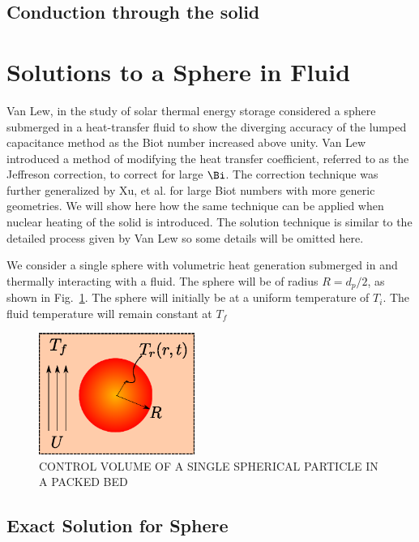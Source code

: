 \subsection{Conduction through the solid}\label{sec:ht-jeffreson-correction}


\section{Solutions to a Sphere in Fluid}
Van Lew\cite{VanLew2010}, in the study of solar thermal energy storage considered a sphere submerged in a heat-transfer fluid to show the diverging accuracy of the lumped capacitance method as the Biot number increased above unity. Van Lew introduced a method of modifying the heat transfer coefficient, referred to as the Jeffreson correction, to correct for large $\Bi$. The correction technique was further generalized by Xu, et al.\cite{Xu2012} for large Biot numbers with more generic geometries. We will show here how the same technique can be applied when nuclear heating of the solid is introduced. The solution technique is similar to the detailed process given by Van Lew\cite{VanLew2010} so some details will be omitted here.

We consider a single sphere with volumetric heat generation submerged in and thermally interacting with a fluid. The sphere will be of radius $R=d_p/2$, as shown in Fig.~\ref{fig:ParticleControlVolume}. The sphere will initially be at a uniform temperature of $T_i$. The fluid temperature will remain constant at $T_f$

\begin{figure}[ht]
	\centering
		\includegraphics[width=2in]{chapters/figures/ParticleControlVolume}
	\caption[Control volume of single spherical particle in a packed bed]{CONTROL VOLUME OF A SINGLE SPHERICAL PARTICLE IN A PACKED BED}
	\label{fig:ParticleControlVolume}
\end{figure}


\subsection{Exact Solution for Sphere}

